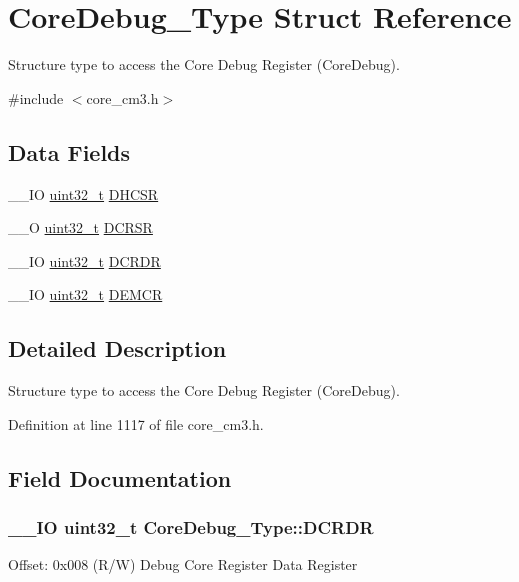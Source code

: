 \hypertarget{struct_core_debug___type}{\section{Core\-Debug\-\_\-\-Type Struct Reference}
\label{struct_core_debug___type}
}


Structure type to access the Core Debug Register (Core\-Debug).  




{\ttfamily \#include $<$core\-\_\-cm3.\-h$>$}

\subsection*{Data Fields}
\begin{DoxyCompactItemize}
\item 
\-\_\-\-\_\-\-I\-O \hyperlink{stdint_8h_a435d1572bf3f880d55459d9805097f62}{uint32\-\_\-t} \hyperlink{struct_core_debug___type_a25c14c022c73a725a1736e903431095d}{D\-H\-C\-S\-R}
\item 
\-\_\-\-\_\-\-O \hyperlink{stdint_8h_a435d1572bf3f880d55459d9805097f62}{uint32\-\_\-t} \hyperlink{struct_core_debug___type_afefa84bce7497652353a1b76d405d983}{D\-C\-R\-S\-R}
\item 
\-\_\-\-\_\-\-I\-O \hyperlink{stdint_8h_a435d1572bf3f880d55459d9805097f62}{uint32\-\_\-t} \hyperlink{struct_core_debug___type_ab8f4bb076402b61f7be6308075a789c9}{D\-C\-R\-D\-R}
\item 
\-\_\-\-\_\-\-I\-O \hyperlink{stdint_8h_a435d1572bf3f880d55459d9805097f62}{uint32\-\_\-t} \hyperlink{struct_core_debug___type_a5cdd51dbe3ebb7041880714430edd52d}{D\-E\-M\-C\-R}
\end{DoxyCompactItemize}


\subsection{Detailed Description}
Structure type to access the Core Debug Register (Core\-Debug). 

Definition at line 1117 of file core\-\_\-cm3.\-h.



\subsection{Field Documentation}
\hypertarget{struct_core_debug___type_ab8f4bb076402b61f7be6308075a789c9}{
\subsubsection[{D\-C\-R\-D\-R}]{\setlength{\rightskip}{0pt plus 5cm}\-\_\-\-\_\-\-I\-O {\bf uint32\-\_\-t} Core\-Debug\-\_\-\-Type\-::\-D\-C\-R\-D\-R}}\label{struct_core_debug___type_ab8f4bb076402b61f7be6308075a789c9}
Offset\-: 0x008 (R/\-W) Debug Core Register Data Register

